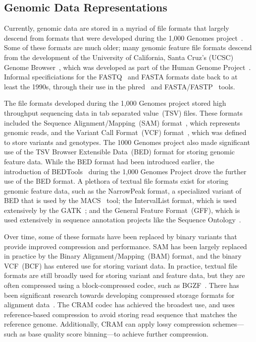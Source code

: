 \documentclass[phd]{ucbthesis}
\begin{document}
\subsection{Genomic Data Representations}
\label{sec:genomic-data-representations}

Currently, genomic data are stored in a myriad of file formats that largely
descend from formats that were developed during the 1,000 Genomes
project~\cite{1kg}. Some of these formats are much older; many genomic feature
file formats descend from the development of the University of California,
Santa Cruz's (UCSC) Genome Browser~\cite{kent02}, which was developed as part
of the Human Genome Project~\cite{lander01}. Informal specificiations for
the FASTQ~\cite{cock10} and FASTA formats date back to at least the 1990s,
through their use in the {phred}~\cite{ewing98} and
{FASTA}/{FASTP}~\cite{pearson90} tools.

The file formats developed during the 1,000 Genomes project stored high
throughput sequencing data in tab separated value~(TSV) files. These
formats included the {Sequence Alignment/Mapping}~(SAM)
format~\cite{li09}, which represents genomic reads, and the {Variant Call
  Format}~(VCF) format~\cite{danecek11}, which was defined to store variants
and genotypes. The 1000 Genomes project also made significant use of the
TSV {Browser Extensible Data}~(BED) format for storing genomic feature
data. While the BED format had been introduced earlier, the introduction of
{BEDTools}~\cite{quinlan10} during the 1,000 Genomes Project drove
the further use of the BED format. A plethora of textual file formats exist for
storing genomic feature data, such as the {NarrowPeak} format, a
specialized variant of BED that is used by the {MACS}~\cite{zhang08}
tool; the {IntervalList} format, which is used extensively by the
{GATK}~\cite{depristo11}; and the {General Feature Format}~(GFF),
which is used extensively in sequence annotation projects like the Sequence
Ontology~\cite{eilbeck05}.

Over time, some of these formats have been replaced by binary variants that
provide improved compression and performance. SAM has been largely replaced
in practice by the {Binary Alignment/Mapping}~(BAM) format, and the
binary VCF~(BCF) has entered use for storing variant data. In practice,
textual file formats are still broadly used for storing variant and feature
data, but they are often compressed using a block-compressed codec, such as
BGZF~\cite{li11tabix}. There has been significant research towards developing
compressed storage formats for alignment data~\cite{kozanitis11, fritz11}.
The CRAM codec has achieved the broadest use, and uses reference-based
compression to avoid storing read sequence that matches the reference genome.
Additionally, CRAM can apply lossy compression schemes---such as base quality
score binning---to achieve further compression.
\end{document}
